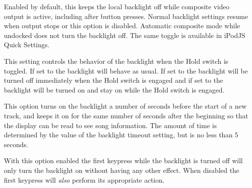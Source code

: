 \begin{description}
\begin{description}
{{        \item[TV Backlight Off.]
        Enabled by default, this keeps the local backlight off while composite
        video output is active, including after button presses. Normal
        backlight settings resume when output stops or this option is disabled.
        Automatic composite mode while undocked does not turn the backlight off.
        The same toggle is available in iPodJS Quick Settings.
      }
      \item[Backlight on Hold.]
      This setting controls the behavior of the backlight when the Hold switch
      is toggled. If set to  the backlight will behave as usual.
      If set to  the backlight will be turned off immediately when
      the Hold switch is engaged and if set to  the backlight will
      be turned on and stay on while the Hold switch is engaged.
      \item[Caption Backlight.]
      This option turns on the backlight a number of seconds before the start
      of a new track, and keeps it on for the same number of seconds after the
      beginning so that the display can be read to see song information. The
      amount of time is determined by the value of the backlight timeout
      setting, but is no less than 5 seconds.
      \item[First Keypress Enables Backlight Only.]
      With this option enabled the first keypress while the backlight is turned
      off will only turn the backlight on without having any other effect. When
      disabled the first keypress will \emph{also} perform its appropriate action.

}
\end{description}
\end{description}
